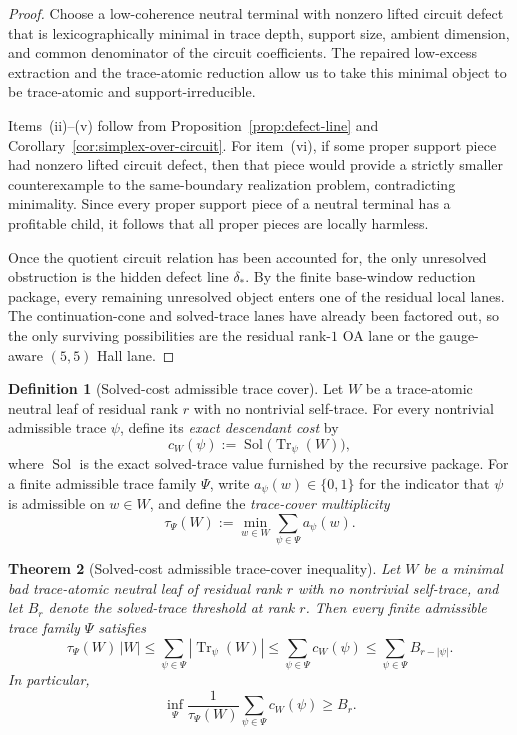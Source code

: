 \documentclass[11pt]{article}
\newtheorem{theorem}{Theorem}[section]
\theoremstyle{definition}
\newtheorem{definition}[theorem]{Definition}
\newcommand{\1}{\mathbf{1}}
\begin{document}
\begin{proof}
Choose a low-coherence neutral terminal with nonzero lifted circuit defect that is lexicographically minimal in trace depth, support size, ambient dimension, and common denominator of the circuit coefficients. The repaired low-excess extraction and the trace-atomic reduction allow us to take this minimal object to be trace-atomic and support-irreducible.

Items~(ii)--(v) follow from Proposition~\ref{prop:defect-line} and Corollary~\ref{cor:simplex-over-circuit}. For item~(vi), if some proper support piece had nonzero lifted circuit defect, then that piece would provide a strictly smaller counterexample to the same-boundary realization problem, contradicting minimality. Since every proper support piece of a neutral terminal has a profitable child, it follows that all proper pieces are locally harmless.

Once the quotient circuit relation has been accounted for, the only unresolved obstruction is the hidden defect line $\delta_*$. By the finite base-window reduction package, every remaining unresolved object enters one of the residual local lanes. The continuation-cone and solved-trace lanes have already been factored out, so the only surviving possibilities are the residual rank-$1$ OA lane or the gauge-aware $(5,5)$ Hall lane.
\end{proof}

\begin{definition}[Solved-cost admissible trace cover]\label{def:solved-cost-trace-cover}
Let $W$ be a trace-atomic neutral leaf of residual rank $r$ with no nontrivial self-trace. For every nontrivial admissible trace $\psi$, define its \emph{exact descendant cost} by
\[
c_W(\psi):=\operatorname{Sol}\bigl(\operatorname{Tr}_\psi(W)\bigr),
\]
where $\operatorname{Sol}$ is the exact solved-trace value furnished by the recursive package.
For a finite admissible trace family $\Psi$, write $a_\psi(w)\in\{0,1\}$ for the indicator that $\psi$ is admissible on $w\in W$, and define the \emph{trace-cover multiplicity}
\[
\tau_\Psi(W):=\min_{w\in W}\sum_{\psi\in\Psi} a_\psi(w).
\]
\end{definition}

\begin{theorem}[Solved-cost admissible trace-cover inequality]\label{thm:solved-cost-trace-cover}
Let $W$ be a minimal bad trace-atomic neutral leaf of residual rank $r$ with no nontrivial self-trace, and let $B_r$ denote the solved-trace threshold at rank $r$. Then every finite admissible trace family $\Psi$ satisfies
\[
\tau_\Psi(W)\,|W|
\le
\sum_{\psi\in\Psi} |\operatorname{Tr}_\psi(W)|
\le
\sum_{\psi\in\Psi} c_W(\psi)
\le
\sum_{\psi\in\Psi} B_{r-|\psi|}.
\]
In particular,
\[
\inf_{\Psi}
\frac{1}{\tau_\Psi(W)}
\sum_{\psi\in\Psi} c_W(\psi)
\ge B_r.
\]
\end{theorem}
\end{document}
